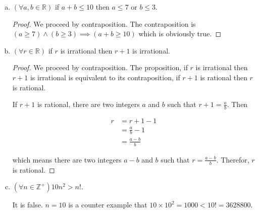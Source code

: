 \documentclass{article}
\begin{document}
\begin{enumerate}[(a)]
\begin{proof}
\begin{enumerate}[(1)]
        Both sides of the equation are equal.
        
        \item If $x < y$, then $min(x, y) = x$
        \begin{equation*}
            \begin{split}
            & (x + y - \mid x - y \mid) / 2 \\
             = & (x + y + x - y) / 2 \\
             = & x
            \end{split}
        \end{equation*}
        
        Both sides of the equation are equal.
    \end{enumerate}
    \end{proof}
    
    \item $(\forall a, b \in \mathbb{R})$ if $a + b \leq 10$ then $a \leq 7$ or $b \leq 3$.
    
    \begin{proof}
    We proceed by contraposition. The contraposition is $(a \geq 7) \land (b \geq 3) \implies (a + b \geq 10) $ which is obviously true.
    \end{proof}
    
    \item $(\forall r \in \mathbb{R})$ if $r$ is irrational then $r + 1$ is irrational.
    
    \begin{proof}
    We proceed by contraposition. The proposition, if $r$ is irrational then $r + 1$ is irrational is equivalent to its contraposition, if $r + 1$ is rational then $r$ is rational.
    
    If $r + 1$ is rational, there are two integers $a$ and $b$ such that $r + 1 = \frac{a}{b}$. Then
    
    \begin{equation*}
        \begin{split}
            r & = r + 1 - 1 \\
              & = \frac{a}{b} - 1 \\
              & = \frac{a - b}{b}
        \end{split}
    \end{equation*}
    
    which means there are two integers $a - b$ and $b$ such that $r = \frac{a - b}{b}$. Therefor, $r$ is rational.
    
    \end{proof}
    
    \item $(\forall n \in \mathbb{Z}^+) 10n^2 > n!$.
    
    It is false. $n = 10$ is a counter example that $10 \times 10^2 = 1000 < 10! = 3628800$.
\end{enumerate}
\end{document}
